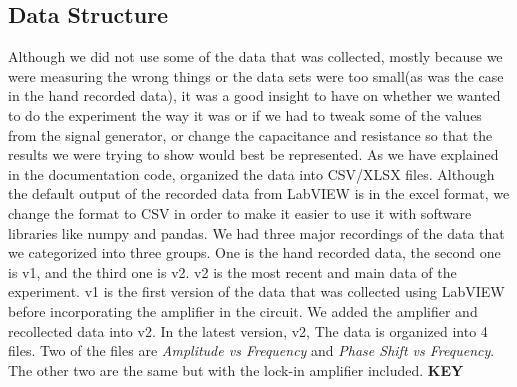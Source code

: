 \documentclass[twocolumn]{article}\usepackage[english]{babel}
\begin{document}
\subsection{Data Structure}
Although we did not use some of the data that was collected, mostly because we were measuring the wrong things or the data sets were too small(as was the case in the hand recorded data), it was a good insight to have on whether we wanted to do the experiment the way it was or if we had to tweak some of the values from the signal generator, or change the capacitance and resistance so that the results we were trying to show would best be represented. As we have explained in the documentation code, organized the data into CSV/XLSX files. Although the default output of the recorded data from LabVIEW is in the excel format, we change the format to CSV in order to make it easier to use it with software libraries like numpy and pandas. We had three major recordings of the data that we categorized into three groups. One is the hand recorded data, the second one is v1, and the third one is v2. v2 is the most recent and main data of the experiment. v1 is the first version of the data that was collected using LabVIEW before incorporating the amplifier in the circuit. We added the amplifier and recollected data into v2. In the latest version, v2, The data is organized into 4 files. Two of the files are \textit{Amplitude vs Frequency} and \textit{Phase Shift vs Frequency}. The other two are the same but with the lock-in amplifier included. \newline \newline \newline \newline \newline \newline \newline \newline \newline \newline \newline \newline \newline \newline \newline \newline \newline \newline \newline \newline \textbf{KEY} \begin{Steps}

\end{Steps}
\end{document}
